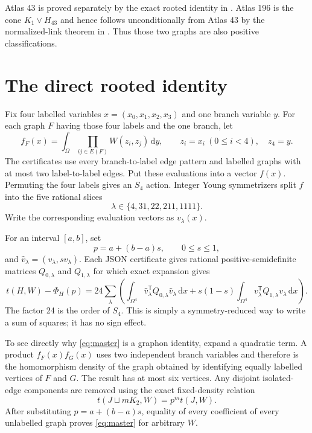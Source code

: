 \documentclass[11pt]{article}
\newcommand{\dd}{\,\mathrm d}
\begin{document}
Atlas 43 is proved separately by the exact rooted identity in
.  Atlas 196 is the cone
$K_1\vee H_{43}$ and hence follows unconditionally from Atlas 43 by the
normalized-link theorem in .
Thus those two graphs are also positive classifications.

\section{The direct rooted identity}

Fix four labelled variables $x=(x_0,x_1,x_2,x_3)$ and one branch variable
$y$.  For each graph $F$ having those four labels and the one branch, let
\[
 f_F(x)=\int_\Omega\prod_{ij\in E(F)}W(z_i,z_j)\dd y,
 \qquad z_i=x_i\ (0\leq i<4),\quad z_4=y.
\]
The certificates use every branch-to-label edge pattern and labelled graphs
with at most two label-to-label edges.  Put these evaluations into a vector
$f(x)$.  Permuting the four labels gives an $S_4$ action.  Integer Young
symmetrizers split $f$ into the five rational slices
\[
                  \lambda\in\{4,31,22,211,1111\}.
\]
Write the corresponding evaluation vectors as $v_\lambda(x)$.

For an interval $[a,b]$, set
\[
                  p=a+(b-a)s,\qquad 0\leq s\leq1,
\]
and $\widehat v_\lambda=(v_\lambda,sv_\lambda)$.  Each JSON certificate
gives rational positive-semidefinite matrices $Q_{0,\lambda}$ and
$Q_{1,\lambda}$ for which exact expansion gives
\begin{equation}\label{eq:master}
\boxed{
 t(H,W)-\Phi_H(p)=
 24\sum_\lambda\left(
  \int_{\Omega^4}\widehat v_\lambda^{\mathsf T}
     Q_{0,\lambda}\widehat v_\lambda\dd x
 +s(1-s)\int_{\Omega^4}v_\lambda^{\mathsf T}
     Q_{1,\lambda}v_\lambda\dd x\right).}
\end{equation}
The factor 24 is the order of $S_4$.  This is simply a symmetry-reduced
way to write a sum of squares; it has no sign effect.

To see directly why \eqref{eq:master} is a graphon identity, expand a
quadratic term.  A product $f_F(x)f_G(x)$ uses two independent branch
variables and therefore is the homomorphism density of the graph obtained
by identifying equally labelled vertices of $F$ and $G$.  The result has at
most six vertices.  Any disjoint isolated-edge components are removed using
the exact fixed-density relation
\[
                 t(J\sqcup mK_2,W)=p^m t(J,W).
\]
After substituting $p=a+(b-a)s$, equality of every coefficient of every
unlabelled graph proves \eqref{eq:master} for arbitrary $W$.
\end{document}
